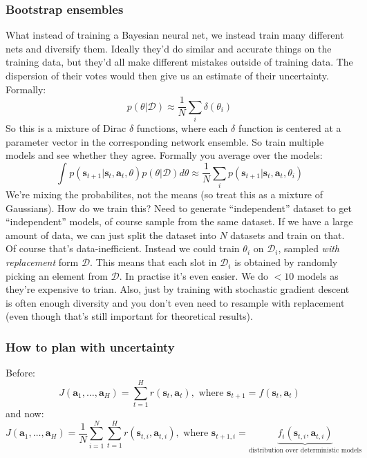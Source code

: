 \documentclass{report}
\begin{document}
\subsubsection{Bootstrap ensembles}
What instead of training a Bayesian neural net, we instead train many different nets and diversify them.
Ideally they'd do similar and accurate things on the training data, but they'd all make different mistakes outside of training data.
The dispersion of their votes would then give us an estimate of their uncertainty.
Formally:
\begin{equation}
		p(\theta|\mathcal{D}) \approx \frac{1}{N} \sum_{i}^{} \delta(\theta_i)
\end{equation}
So this is a mixture of Dirac $\delta$ functions, where each $\delta$ function is centered at a parameter vector
in the corresponding network ensemble.
So train multiple models and see whether they agree. Formally you average over the models:
\begin{equation}
\int_{}^{} p(\bm{s}_{t+1}| \bm{s}_{t}, \bm{a}_{t}, \theta) p(\theta | \mathcal{D})d\theta	
\approx \frac{1}{N} \sum_{i}^{} p(\bm{s}_{t+1}| \bm{s}_{t}, \bm{a}_{t}, \theta_i)
\end{equation}
We're mixing the probabilites, not the means (so treat this as a mixture of Gaussians).
How do we train this?
Need to generate ``independent'' dataset to get ``independent'' models, of course sample from the same dataset.
If we have a large amount of data, we can just split the dataset into $N$ datasets and train on that.
Of course that's data-inefficient.
Instead we could train $\theta_i$ on $\mathcal{D}_i$, sampled \textit{with replacement} form $\mathcal{D}$.
This means that each slot in $\mathcal{D}_i$ is obtained by randomly picking an element from $\mathcal{D}$.
In practise it's even easier. We do $<10$ models as they're expensive to trian.
Also, just by training with stochastic gradient descent is often enough diversity and you don't 
even need to resample with replacement (even though that's still important for theoretical results).

\subsubsection{How to plan with uncertainty}
Before:
\begin{equation}
		J(\bm{a}_{1}, \dots, \bm{a}_{H}) = \sum_{t=1}^{H} r (\bm{s}_{t}, \bm{a}_{t} ), \text{ where } \bm{s}_{t+1} = f (\bm{s}_{t}, \bm{a}_{t} )
\end{equation}
and now:
\begin{equation}
		J(\bm{a}_{1}, \dots, \bm{a}_{H}) = \frac{1}{N}  \sum_{i=1}^{N} \sum_{t=1}^{H} r (\bm{s}_{t,i}, \bm{a}_{t,i} ), \text{ where } \bm{s}_{t+1,i} = 
		\underbrace{f_i (\bm{s}_{t,i}, \bm{a}_{t,i} )}_{\text{distribution over deterministic models}}
\end{equation}
\end{document}
